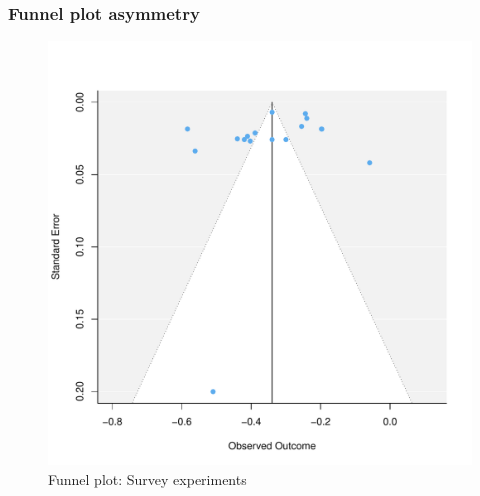 \documentclass[usenames,dvipsnames]{beamer}
\begin{document}
\begin{frame}[label=supplemental]
\frametitle{Funnel plot asymmetry}

\begin{figure}[!hb]
\vspace*{-3mm}
\includegraphics[scale = 0.45]{../figs/funnel_re_survey.pdf}
\vspace{-0.2cm}
\caption{Funnel plot: Survey experiments}
\small
\vspace{-0.5cm}
\label{fig: funnel_all}
\end{figure}
\end{frame}


\end{document}
